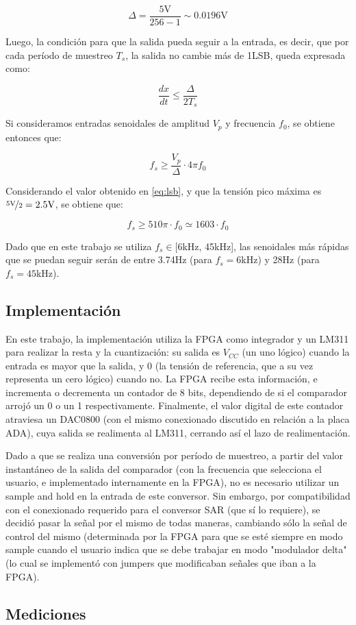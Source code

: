 \documentclass[assd_tp3_main.tex]{subfiles}
\begin{document}
\begin{equation}
	\Delta = \frac{5\mathrm{V}}{256-1} \sim 0.0196\mathrm{V}
	\label{eq:lsb}
\end{equation}

Luego, la condici\'on para que la salida pueda seguir a la entrada, es decir, que por cada per\'iodo de muestreo $T_s$, la salida no cambie m\'as de 1LSB, queda expresada como:

\begin{equation}
	\frac{dx}{dt} \leq \frac{\Delta}{2T_s}
\end{equation}

Si consideramos entradas senoidales de amplitud $V_p$ y frecuencia $f_0$, se obtiene entonces que:

\begin{equation}
	f_s \geq \frac{V_p}{\Delta} \cdot 4\pi f_0
	\label{eq:deriv}
\end{equation}

Considerando el valor obtenido en \ref{eq:lsb}, y que la tensi\'on pico m\'axima es $\nicefrac{5\mathrm{V}}{2} = 2.5\mathrm{V}$, se obtiene que:

\begin{equation}
	f_s \geq 510 \pi \cdot f_0 \simeq 1603 \cdot f_0
	\label{eq:f-sin}
\end{equation}

Dado que en este trabajo se utiliza $f_s \in [6$kHz, 45kHz], las senoidales m\'as r\'apidas que se puedan seguir ser\'an de entre 3.74Hz (para $f_s=6$kHz) y 28Hz (para $f_s=45$kHz).


\subsection{Implementaci\'on}

En este trabajo, la implementaci\'on utiliza la FPGA como integrador y un LM311 para realizar la resta y la cuantizaci\'on: su salida es $V_{CC}$ (un uno l\'ogico) cuando la entrada es mayor que la salida, y 0 (la tensi\'on de referencia, que a su vez representa un cero l\'ogico) cuando no. La FPGA recibe esta informaci\'on, e incrementa o decrementa un contador de 8 bits, dependiendo de si el comparador arroj\'o un 0 o un 1 respectivamente. Finalmente, el valor digital de este contador atraviesa un DAC0800 (con el mismo conexionado discutido en relaci\'on a la placa ADA), cuya salida se realimenta al LM311, cerrando as\'i el lazo de realimentaci\'on.

Dado a que se realiza una conversi\'on por per\'iodo de muestreo, a partir del valor instant\'aneo de la salida del comparador (con la frecuencia que selecciona el usuario, e implementado internamente en la FPGA), no es necesario utilizar un sample and hold en la entrada de este conversor. Sin embargo, por compatibilidad con el conexionado requerido para el conversor SAR (que s\'i lo requiere), se decidi\'o pasar la se\~nal por el mismo de todas maneras, cambiando s\'olo la se\~nal de control del mismo (determinada por la FPGA  para que se est\'e siempre en modo sample cuando el usuario indica que se debe trabajar en modo "modulador delta" (lo cual se implement\'o con jumpers que modificaban se\~nales que iban a la FPGA).


\subsection{Mediciones}
\end{document}

